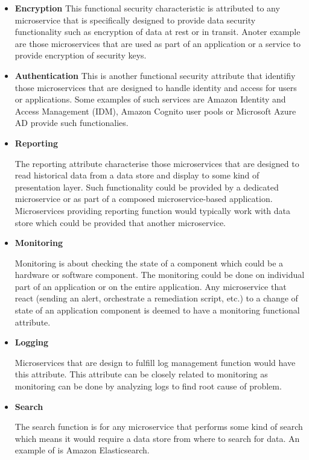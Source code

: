 \documentclass{article}
\begin{document}
\begin{itemize}
\item \textbf{Encryption}
This functional security characteristic is attributed to any microservice that is specifically designed to provide data security functionality such as encryption of data at rest or in transit. Anoter example are those microservices that are used as part of an application or a service to provide encryption of security keys. 

\item \textbf{Authentication}
This is another functional security attribute that identifiy those microservices that are designed to handle identity and access for users or applications. Some examples of such services are Amazon Identity and Access Management (IDM), Amazon Cognito user pools or Microsoft Azure AD provide such functionalies.

\item \textbf{Reporting}

The reporting attribute characterise those microservices that are designed to read historical data from a data store and display to some kind of presentation layer. Such functionality could be provided by a dedicated microservice or as part of a composed microservice-based application. Microservices providing reporting function would typically work with data store which could be provided that another microservice.

\item \textbf{Monitoring} 

Monitoring is about checking the state of a component which could be a hardware or software component. The monitoring could be done on individual part of an application or on the entire application. Any microservice that react (sending an alert, orchestrate a remediation script, etc.) to a change of state of an application component is deemed to have a monitoring functional attribute.

\item \textbf{Logging}

Microservices that are design to fulfill log management function would have this attribute. This attribute can be closely related to monitoring as monitoring can be done by analyzing logs to find root cause of problem.

\item \textbf{Search}

The search function is for any microservice that performs some kind of search which means it would require a data store from where to search for data. An example of is Amazon Elasticsearch.


\end{itemize}
\end{document}
